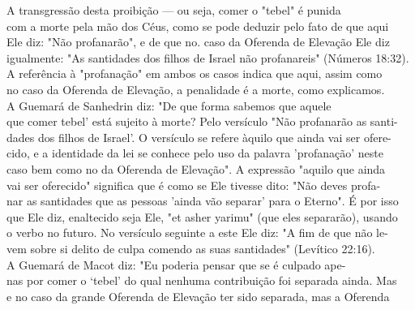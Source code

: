 A transgressão desta proibição --- ou seja, comer o "tebel" é punida\\
com a morte pela mão dos Céus, como se pode deduzir pelo fato de que
aqui\\
Ele diz: "Não profanarão", e de que no. caso da Oferenda de Elevação Ele
diz\\
igualmente: "As santidades dos filhos de Israel não profanareis"
(Números 18:32).\\
A referência à "profanação" em ambos os casos indica que aqui, assim
como\\
no caso da Oferenda de Elevação, a penalidade é a morte, como
explicamos.\\
A Guemará de Sanhedrin diz: "De que forma sabemos que aquele\\
que comer tebel' está sujeito à morte? Pelo versículo "Não profanarão as
santi-\\
dades dos filhos de Israel'. O versículo se refere àquilo que ainda vai
ser ofere-\\
cido, e a identidade da lei se conhece pelo uso da palavra 'profanação'
neste\\
caso bem como no da Oferenda de Elevação". A expressão "aquilo que
ainda\\
vai ser oferecido" significa que é como se Ele tivesse dito: "Não deves
profa-\\
nar as santidades que as pessoas 'ainda vão separar' para o Eterno". É
por isso\\
que Ele diz, enaltecido seja Ele, "et asher yarimu" (que eles
separarão), usando\\
o verbo no futuro. No versículo seguinte a este Ele diz: "A fim de que
não le-\\
vem sobre si delito de culpa comendo as suas santidades" (Levítico
22:16).\\
A Guemará de Macot diz: "Eu poderia pensar que se é culpado ape-\\
nas por comer o `tebel' do qual nenhuma contribuição foi separada ainda.
Mas\\
e no caso da grande Oferenda de Elevação ter sido separada, mas a
Oferenda

